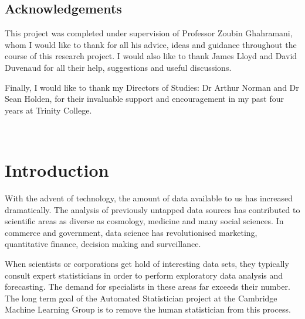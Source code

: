 \documentclass[a4paper,12pt ]{report}
\begin{document}
\pagestyle{empty}
\singlespacing

\onehalfspacing

\singlespacing


\clearpage

\setcounter{page}{1}
\pagestyle{plain}
\tableofcontents

\onehalfspacing


	\clearpage
	
	
	\section*{Acknowledgements}
	
This project was completed under supervision of Professor Zoubin Ghahramani, whom I would like to thank for all his advice, ideas and guidance throughout the course of this research project. I would also like to thank James Lloyd and David Duvenaud for all their help, suggestions and useful discussions.
	
Finally, I would like to thank my Directors of Studies: Dr Arthur Norman and Dr Sean Holden, for their invaluable support and encouragement in my past four years at Trinity College.


	\clearpage        %

	~~~
	
	\clearpage


\chapter{Introduction}
\setcounter{page}{1}


With the advent of technology, the amount of data available to us has increased dramatically. The analysis of previously untapped data sources has contributed to scientific areas as diverse as cosmology, medicine and many social sciences. In commerce and government, data science has revolutionised marketing, quantitative finance, decision making and surveillance.


When scientists or corporations get hold of interesting data sets, they typically consult expert statisticians in order to perform exploratory data analysis and forecasting. The demand for specialists in these areas far exceeds their number. The long term goal of the Automated Statistician project at the Cambridge Machine Learning Group is to remove the human statistician from this process.
\end{document}
